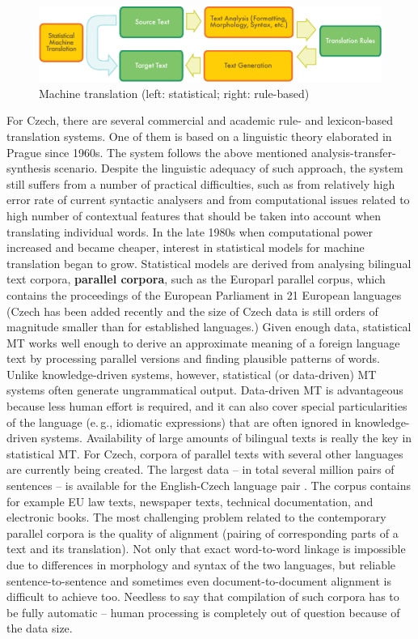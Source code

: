 \begin{multicols}{2}
\begin{figure}[htb]
  \center
  \includegraphics[width=\textwidth]{../_media/english/machine_translation}
  \caption{Machine translation (left: statistical; right: rule-based)}
  \label{fig:mtarch_en}
\end{figure}

For Czech, there are several commercial and academic rule- and lexicon-based translation systems. One of them is based on a linguistic theory elaborated in Prague since 1960s. The system follows the above mentioned analysis-transfer-synthesis scenario. Despite the linguistic adequacy of such approach, the system still suffers from a number of practical difficulties, such as from relatively high error rate of current syntactic analysers and from computational issues related to high number of contextual features that should be taken into account when translating individual words.
In the late 1980s when computational power increased and became cheaper, interest in statistical models for machine translation began to grow. Statistical models are derived from analysing bilingual text corpora, \textbf{parallel corpora}, such as the Europarl parallel corpus, which contains the proceedings of the European Parliament in 21 European languages (Czech has been added recently and the size of Czech data is still orders of magnitude smaller than for established languages.) Given enough data, statistical MT works well enough to derive an approximate meaning of a foreign language text by processing parallel versions and finding plausible patterns of words. Unlike knowledge-driven systems, however, statistical (or data-driven) MT systems often generate ungrammatical output. Data-driven MT is advantageous because less human effort is required, and it can also cover special particularities of the language (e.\,g., idiomatic expressions) that are often ignored in knowledge-driven systems. 
Availability of large amounts of bilingual texts is really the key in statistical MT. For Czech, corpora of parallel texts with several other languages are currently being created. The largest data – in total several million pairs of sentences – is available for the English-Czech language pair \cite{Note20}. The corpus contains for example EU law texts, newspaper texts, technical documentation, and electronic books. The most challenging problem related to the contemporary parallel corpora is the quality of alignment (pairing of corresponding parts of a text and its translation). Not only that exact word-to-word linkage is impossible due to differences in morphology and syntax of the two languages, but reliable sentence-to-sentence and sometimes even document-to-document alignment is difficult to achieve too. Needless to say that compilation of such corpora has to be fully automatic – human processing is completely out of question because of the data size.\\

\end{multicols}
